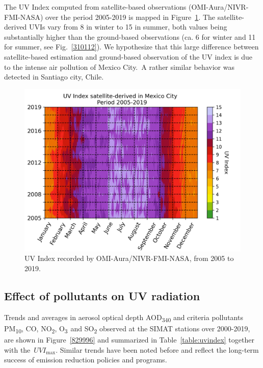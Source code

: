 \documentclass[10pt]{article}
\begin{document}
The UV Index computed from satellite-based observations
(OMI-Aura/NIVR-FMI-NASA) over the period 2005-2019 is mapped in
Figure~{\ref{485116}}. The satellite-derived UVIs vary
from 8 in winter to 15 in summer, both values being substantially higher
than the ground-based observations (ca. 6 for winter and 11 for summer,
see Fig.~{\ref{310112}}). We hypothesize that this
large difference between satellite-based estimation and ground-based
observation of the UV index is due to the intense air pollution of
Mexico City.~A rather similar behavior was detected in Santiago city,
Chile.~\cite{Cabrera_2012}
\begin{figure}[H]
  \begin{center}
    \includegraphics[width=0.70\columnwidth]{figures/UVI-OMI/UVI-OMI}
    \caption{{UV Index recorded by OMI-Aura/NIVR-FMI-NASA, from 2005 to 2019.
            {\label{485116}}%
        }}
  \end{center}
\end{figure}

\subsection*{Effect of pollutants on UV
  radiation}

{\label{884442}}

Trends and averages in aerosol optical depth AOD\textsubscript{340} and
criteria pollutants PM\textsubscript{10}, CO, NO\textsubscript{2},
O\textsubscript{3~}and SO\textsubscript{2} observed at the SIMAT
stations over 2000-2019, are shown in
Figure~{\ref{829996}} and summarized in
Table~{\ref{table:uvindex}} together with
the~\(UVI_{\max}\). Similar trends have been noted
before \cite{Parrish_2011,2017,Molina_2019} and reflect the long-term success of
emission reduction policies and programs.
\end{document}

